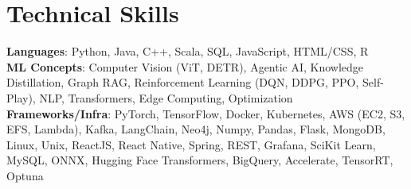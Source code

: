 \documentclass[letterpaper,11pt]{article}
\begin{document}
%
\section{Technical Skills}
\begin{itemize}[leftmargin=0.15in, label={}]
  \small{\item{
        \textbf{Languages}{: Python, Java, C++, Scala, SQL, JavaScript, HTML/CSS, R} \\
        \textbf{ML Concepts}{: Computer Vision (ViT, DETR), Agentic AI, Knowledge Distillation, Graph RAG, Reinforcement Learning (DQN, DDPG, PPO, Self-Play), NLP, Transformers, Edge Computing, Optimization} \\
        \textbf{Frameworks/Infra}{: PyTorch, TensorFlow, Docker, Kubernetes, AWS (EC2, S3, EFS, Lambda), Kafka, LangChain, Neo4j, Numpy, Pandas, Flask, MongoDB, Linux, Unix, ReactJS, React Native, Spring, REST, Grafana, SciKit Learn, MySQL, ONNX, Hugging Face Transformers, BigQuery, Accelerate, TensorRT, Optuna} \\
        }}
\end{itemize}
\vspace{-15pt}
\end{document}
